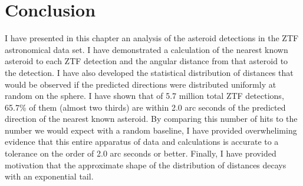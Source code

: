 \section{Conclusion}
\label{section_conclusion}
I have presented in this chapter an analysis of the asteroid detections in the ZTF astronomical data set.
I have demonstrated a calculation of the nearest known asteroid to each ZTF detection 
and the angular distance from that asteroid to the detection.
I have also developed the statistical distribution of distances that would be observed 
if the predicted directions were distributed uniformly at random on the sphere.
I have shown that of 5.7 million total ZTF detections, 65.7\% of them (almost two thirds)
are within 2.0 arc seconds of the predicted direction of the nearest known asteroid.
By comparing this number of hits to the number we would expect with a random baseline,
I have provided overwheliming evidence that this entire apparatus of data and calculations is accurate 
to a tolerance on the order of 2.0 arc seconds or better.
Finally, I have provided motivation that the approximate shape of the distribution of distances decays with an exponential tail.